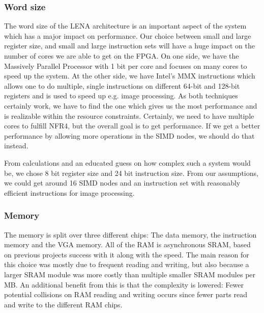 \subsubsection{Word size}

The word size of the \ac{LENA} architecture is an important aspect of the system which
has a major impact on performance. Our choice between small and large
register size, and
small and large instruction sets will have a huge impact on the number of cores
we are able to get on the \ac{FPGA}. On one side, we have the Massively Parallel
Processor\cite{potter1985mpp} with 1 bit per core and focuses on many cores to
speed up the system. At the other side, we have Intel's MMX instructions which
allows one to do multiple, single instructions on different 64-bit and 128-bit
registers and is used to speed up e.g. image processing\cite{lee2004h264}. As
both techniques certainly work, we have to find the one which gives us the most
performance and is realizable within the resource constraints. Certainly, we
need to have multiple cores to fulfill NFR4, but the overall goal is to get
performance. If we get a better performance by allowing more operations in the
\ac{SIMD} nodes, we should do that instead.

From calculations and an educated guess
on how complex such a system would be, we chose 8 bit register size and 24 bit instruction
size. From our assumptions, we could get around 16 \ac{SIMD} nodes and an
instruction set with reasonably efficient instructions for image processing.

\subsubsection{Memory}
 The memory is split over three
different chips: The data memory, the instruction memory and the \ac{VGA}
memory. All of the \ac{RAM} is asynchronous \ac{SRAM}, based on previous
projects success with it\cite{berg2011festinalente} along with the speed. The
main reason for this choice was mostly due to frequent reading and writing, but
also because a larger \ac{SRAM} module was more costly than multiple smaller
\ac{SRAM} modules per \ac{MB}. An additional benefit from this is that the
complexity is lowered: Fewer potential collisions on \ac{RAM} reading and
writing occurs since fewer parts read and write to the different \ac{RAM} chips.

